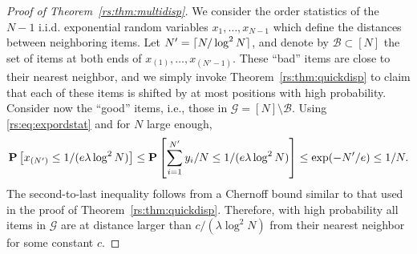 \begin{proof}[Proof of Theorem~\ref{rs:thm:multidisp}]
We consider the order statistics of the $N - 1$ i.i.d. exponential random variables $x_1, \ldots, x_{N-1}$ which define the distances between neighboring items.
Let $N' = \lceil N / \log^2 N\rceil$, and denote by $\mathcal{B} \subset [N]$ the set of items at both ends of $x_{(1)}, \ldots, x_{(N' - 1)}$.
These ``bad'' items are close to their nearest neighbor, and we simply invoke Theorem~\ref{rs:thm:quickdisp} to claim that each of these items is shifted by at most  positions with high probability.
Consider now the ``good'' items, i.e., those in $\mathcal{G} = [N] \setminus \mathcal{B}$.
Using \eqref{rs:eq:expordstat} and for $N$ large enough,
\begin{align*}
\mathbf{P}\left[ x_{(N')} \le 1/(e \lambda \log^2 N) \right]
    \le \mathbf{P}\left[ \sum_{i=1}^{N'} y_i / N \le 1/(e \lambda \log^2 N) \right]
    \le \exp(-N' / e) \le 1 / N.
\end{align*}
The second-to-last inequality follows from a Chernoff bound similar to that used in the proof of Theorem~\ref{rs:thm:quickdisp}.
Therefore, with high probability all items in $\mathcal{G}$ are at distance larger than $c / (\lambda \log^2 N)$ from their nearest neighbor for some constant $c$.


\end{proof}
